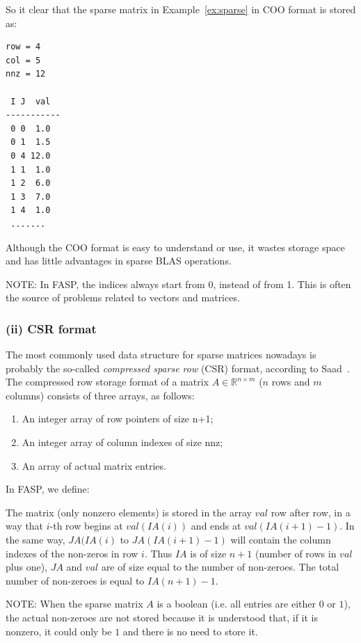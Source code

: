 \documentclass[11pt]{memoir}
\begin{document}
So it clear that the sparse matrix in Example~\ref{ex:sparse} in COO format is stored as:
%
\begin{lstlisting}[numbers=none]
row = 4
col = 5
nnz = 12

 I J  val
-----------
 0 0  1.0
 0 1  1.5
 0 4 12.0
 1 1  1.0
 1 2  6.0
 1 3  7.0
 1 4  1.0
 .......
\end{lstlisting}
%
Although the COO format is easy to understand or use, it wastes storage space and has little advantages in sparse BLAS operations.

\begin{snugshade}\noindent
NOTE: In FASP, the indices always start from 0, instead of from 1. This is often the source of problems related to vectors and matrices.
\end{snugshade}

\subsubsection*{(ii) CSR format}
The most commonly used data structure for sparse matrices nowadays is probably the so-called {\em compressed sparse row}  (CSR) format, according to Saad~\cite{Saad.Saad.2003fv}. The compressed row storage format of a matrix $A\in \mathbb{R}^{n\times m}$ ($n$ rows and $m$ columns) consists of three arrays, as follows:
%
\begin{enumerate}
\item An integer array of row pointers of size n+1;
\item An integer array of column indexes of size nnz;
\item An array of actual matrix entries.
\end{enumerate}
%
In FASP, we define:
%

%

The matrix ({only nonzero elements}) is stored in the array $val$
row after row, in a way that $i$-th row begins at $val(IA(i))$ and ends
at $val(IA(i+1)-1)$. In the same way, $JA(IA(i)$ to $JA(IA(i+1)-1)$ will
contain the column indexes of the non-zeros in row $i$. Thus $IA$ is of
size $n+1$ (number of rows in $val$ plus one), $JA$ and $val$ are of size
equal to the number of non-zeroes. The total number of non-zeroes is
equal to $IA(n+1)-1$.

\begin{snugshade}\noindent
NOTE: When the sparse matrix $A$ is a boolean (i.e. all entries are either $0$ or
$1$), the actual non-zeroes are not stored because it is understood that, if it is
nonzero, it could only be $1$ and there is no need to store it.
\end{snugshade}
\end{document}
